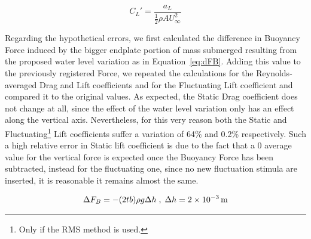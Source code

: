 \documentclass[12pt]{article}
\begin{document}
        \begin{equation} \label{eq:lift_p}
                C_L' = \frac{a_L}{\frac{1}{2} \rho A U_\infty^2}
        \end{equation}

        Regarding the hypothetical errors, we first calculated the difference in Buoyancy Force induced by the bigger endplate portion of mass submerged resulting from the proposed water level variation as in Equation~\ref{eq:dFB}. Adding this value to the previously registered Force, we repeated the calculations for the Reynolds-averaged Drag and Lift coefficients and for the Fluctuating Lift coefficient and compared it to the original values. As expected, the Static Drag coefficient does not change at all, since the effect of the water level variation only has an effect along the vertical axis. Nevertheless, for this very reason both the Static and Fluctuating\footnote{Only if the RMS method is used.} Lift coefficients suffer a variation of 64\% and 0.2\% respectively. Such a high relative error in Static lift coefficient is due to the fact that a 0 average value for the vertical force is expected once the Buoyancy Force has been subtracted, instead for the fluctuating one, since no new fluctuation stimula are inserted, it is reasonable it remains almost the same.

        \begin{equation} \label{eq:dFB}
                \Delta F_B = - (2 t b) \rho g \Delta h \; , \; \Delta h = \SI{2E-3}{\metre}
        \end{equation}



\end{document}
